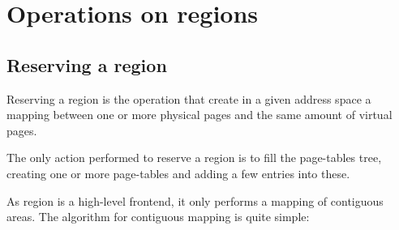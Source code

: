 \section{Operations on regions}

%
%

\subsection{Reserving a region}

Reserving a region is the operation that create in a given address
space a mapping between one or more physical pages and the same amount
of virtual pages.

The only action performed to reserve a region is to fill the
page-tables tree, creating one or more page-tables and adding a few
entries into these.

As region is a high-level frontend, it only performs a mapping of
contiguous areas. The algorithm for contiguous mapping is quite simple:

